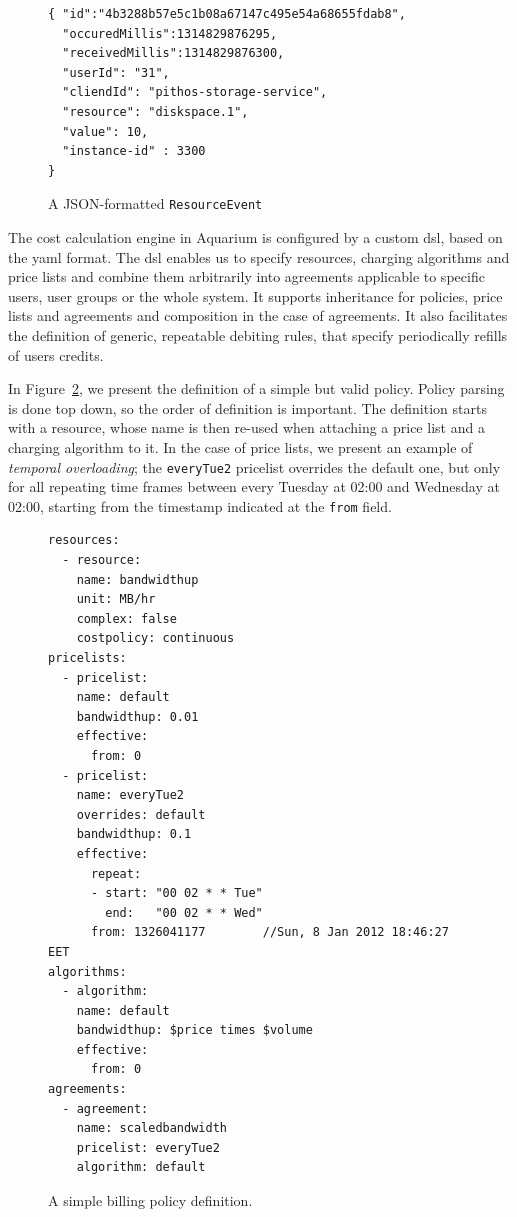 \documentclass[letterpaper,twocolumn,10pt]{article}
\begin{document}
\begin{figure}
\lstset{language=C, basicstyle=\footnotesize,
stringstyle=\ttfamily, 
flexiblecolumns=true, aboveskip=-0.9em, belowskip=0em, lineskip=0em}

\begin{lstlisting}
{ "id":"4b3288b57e5c1b08a67147c495e54a68655fdab8",
  "occuredMillis":1314829876295,
  "receivedMillis":1314829876300,
  "userId": "31",
  "cliendId": "pithos-storage-service",
  "resource": "diskspace.1",
  "value": 10,
  "instance-id" : 3300 
}
\end{lstlisting}
\caption{A JSON-formatted \texttt{ResourceEvent}} 
\label{fig:resevt}
\end{figure}

The cost calculation engine in Aquarium is configured by a 
custom {\sc dsl}, based on the {\sc yaml} format. The {\sc dsl} enables
us to specify resources, charging algorithms and
price lists and combine them arbitrarily into agreements applicable to
specific users, user groups or the whole system. It
supports inheritance for policies, price lists and agreements and
composition in the case of agreements. It also facilitates the
definition of generic, repeatable debiting rules, that specify
periodically refills of users credits.

In Figure~\ref{fig:dsl}, we present the definition of a simple but
valid policy. Policy parsing is done top down, so the order of
definition is important. The definition starts with a resource, whose
name is then re-used when attaching a price list and a charging
algorithm to it. In the case of price lists, we present an example of
\emph{temporal overloading}; the \texttt{everyTue2} pricelist
overrides the default one, but only for all repeating time frames
between every Tuesday at 02:00 and Wednesday at 02:00, starting from
the timestamp indicated at the \texttt{from} field.

\begin{figure}
\lstset{language=c, basicstyle=\footnotesize,
stringstyle=\ttfamily, 
flexiblecolumns=true, aboveskip=-0.9em, belowskip=0em, lineskip=0em}

\begin{lstlisting}
resources:
  - resource:
    name: bandwidthup
    unit: MB/hr
    complex: false
    costpolicy: continuous
pricelists:
  - pricelist: 
    name: default
    bandwidthup: 0.01
    effective:
      from: 0
  - pricelist: 
    name: everyTue2
    overrides: default
    bandwidthup: 0.1
    effective:
      repeat:
      - start: "00 02 * * Tue"
        end:   "00 02 * * Wed"
      from: 1326041177        //Sun, 8 Jan 2012 18:46:27 EET
algorithms:
  - algorithm:
    name: default
    bandwidthup: $price times $volume
    effective:
      from: 0
agreements:
  - agreement:
    name: scaledbandwidth
    pricelist: everyTue2
    algorithm: default
\end{lstlisting}
\caption{A simple billing policy definition.} 
\label{fig:dsl}
\end{figure}
\end{document}

